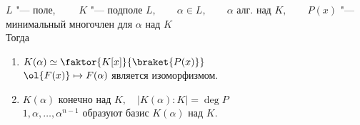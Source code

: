 \begin{theorem}
	$ L $ "--- поле, $ \qquad K $ "--- подполе $ L, \qquad \alpha \in L, \qquad \alpha $ алг. над $ K, \qquad P(x) $ "--- минимальный многочлен для $ \alpha $ над $ K $ \\
	Тогда
	\begin{enumerate}
		\item $ K(\alpha) \simeq \faktor{K[x]}{\braket{P(x)}} $ \\
		$ \ol{F(x)} \mapsto F(\alpha) $ является изоморфизмом.
		\item $ K(\alpha) $ конечно над $ K, \quad |K(\alpha) : K| = \deg P $ \\
		$ 1, \alpha, \dots, \alpha^{n - 1} $ образуют базис $ K(\alpha) $ над $ K $.
	\end{enumerate}
\end{theorem}

